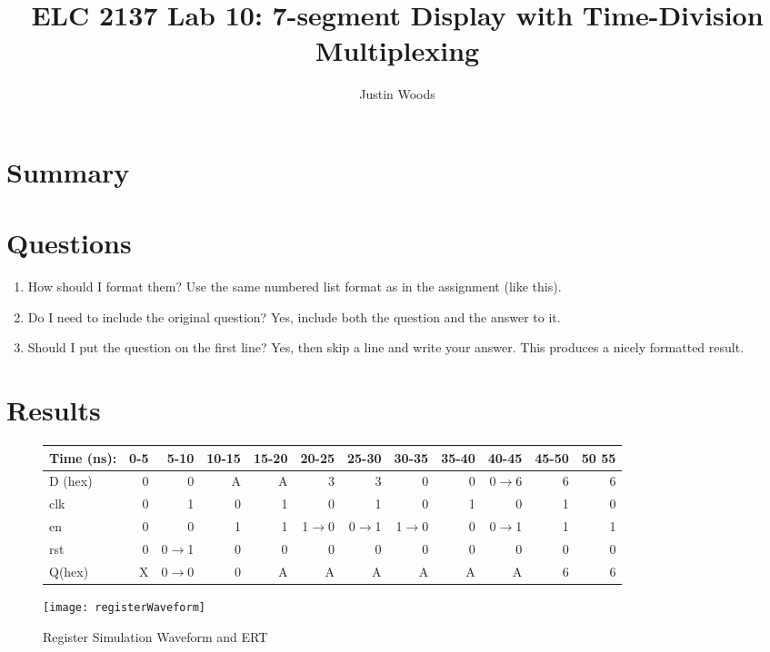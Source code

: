 \documentclass[11pt]{article}
\begin{document}
\title{ELC 2137 Lab 10: 7-segment Display with Time-Division Multiplexing}
\author{Justin Woods}
\maketitle

\section*{Summary}

\section{Questions}

\begin{enumerate}
	\item How should I format them?
	Use the same numbered list format as in the assignment (like this).
	\item Do I need to include the original question?
	Yes, include both the question and the answer to it.
	\item Should I put the question on the first line?
	Yes, then skip a line and write your answer.  This produces a nicely 
	formatted result.
\end{enumerate}

\section*{Results}

\begin{figure}[ht]\centering
	
	\begin{tabular}{l|rrrrrrrrrrr}	
		Time (ns): & 0-5 & 5-10 & 10-15 & 15-20 & 20-25 & 25-30 & 30-35 & 35-40 & 40-45 & 45-50 & 50 55 \\
		\midrule
		D (hex) & 0 & 0 	  & A & A & 3 	    & 3 	  & 0 	    & 0 & 0$\to$6 & 6 & 6 \\
		clk     & 0 & 1 	  & 0 & 1 & 0 	    & 1 	  & 0 	    & 1 & 0 	  & 1 & 0 \\
		en  	& 0 & 0 	  & 1 & 1 & 1$\to$0 & 0$\to$1 & 1$\to$0 & 0 & 0$\to$1 & 1 & 1 \\
		rst 	& 0 & 0$\to$1 & 0 & 0 & 0 		& 0 	  & 0		& 0 & 0		  & 0 & 0 \\
		\midrule
		Q(hex) 	& X & 0$\to$0 & 0 & A & A 		& A 	  & A 		& A & A 	  & 6 & 6 \\
		\bottomrule
	\end{tabular}
	\bigskip
	\texttt{[image: registerWaveform]}
	\caption{Register Simulation Waveform and ERT}
	\label{fig:sim_with_table}
\end{figure}
\end{document}
